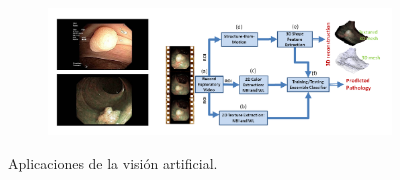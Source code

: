 \begin{figure}
  \hfill
  \begin{subfigure}[t]{0.48\textwidth}
    \centering
    \includegraphics[width=\textwidth]{img/5.png}
  \end{subfigure}

  \caption{Aplicaciones de la visión artificial.}
\end{figure}

